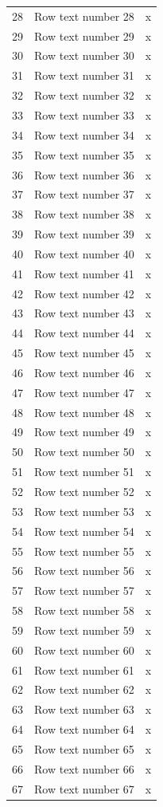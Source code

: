 \documentclass{article}
\begin{document}
\begin{longtable}{|r|p{5cm}|c|}
28&Row text number 28&x\\
29&Row text number 29&x\\
30&Row text number 30&x\\
31&Row text number 31&x\\
32&Row text number 32&x\\
33&Row text number 33&x\\
34&Row text number 34&x\\
35&Row text number 35&x\\
36&Row text number 36&x\\
37&Row text number 37&x\\
38&Row text number 38&x\\
39&Row text number 39&x\\
40&Row text number 40&x\\
41&Row text number 41&x\\
42&Row text number 42&x\\
43&Row text number 43&x\\
44&Row text number 44&x\\
45&Row text number 45&x\\
46&Row text number 46&x\\
47&Row text number 47&x\\
48&Row text number 48&x\\
49&Row text number 49&x\\
50&Row text number 50&x\\
51&Row text number 51&x\\
52&Row text number 52&x\\
53&Row text number 53&x\\
54&Row text number 54&x\\
55&Row text number 55&x\\
56&Row text number 56&x\\
57&Row text number 57&x\\
58&Row text number 58&x\\
59&Row text number 59&x\\
60&Row text number 60&x\\
61&Row text number 61&x\\
62&Row text number 62&x\\
63&Row text number 63&x\\
64&Row text number 64&x\\
65&Row text number 65&x\\
66&Row text number 66&x\\
67&Row text number 67&x\\

\end{longtable}
\end{document}
